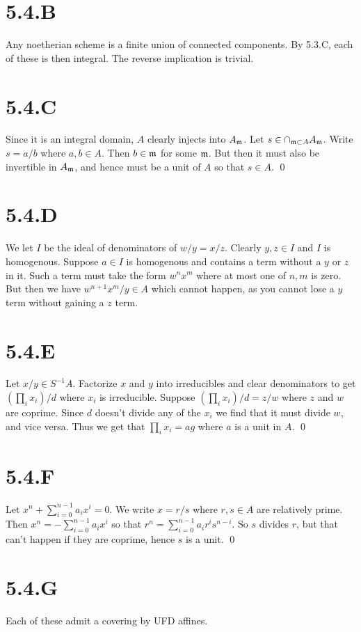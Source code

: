 \documentclass{article}
\begin{document}
\section{5.4.B}
Any noetherian scheme is a finite union of connected components. By 5.3.C, each of these is then integral. The reverse implication is trivial.

\section{5.4.C}
Since it is an integral domain, $A$ clearly injects into $A_{\mathfrak{m}}$. Let $s \in \cap_{\mathfrak{m} \subset A} A_{\mathfrak{m}}$. Write $s=a/b$ where $a, b \in A$. Then $b \in \mathfrak{m}$ for some $\mathfrak{m}$. But then it must also be invertible in $A_{\mathfrak{m}}$, and hence must be a unit of $A$ so that $s \in A$. \qed

\section{5.4.D}
We let $I$ be the ideal of denominators of $w/y=x/z$. Clearly $y, z \in I$ and $I$ is homogenous. Suppose $a \in I$ is homogenous and contains a term without a $y$ or $z$ in it. Such a term must take the form $w^nx^m$ where at most one of $n,m$ is zero. But then we have $w^{n+1}x^m/y \in A$ which cannot happen, as you cannot lose a $y$ term without gaining a $z$ term.

\section{5.4.E}
Let $x/y \in S^{-1}A$. Factorize $x$ and $y$ into irreducibles and clear denominators to get $(\prod_i x_i)/d$ where $x_i$ is irreducible. Suppose $(\prod_i x_i)/d=z/w$ where $z$ and $w$ are coprime. Since $d$ doesn't divide any of the $x_i$ we find that it must divide $w$, and vice versa. Thus we get that $\prod_i x_i=ag$ where $a$ is a unit in $A$. \qed

\section{5.4.F}
Let $x^n+\sum_{i=0}^{n-1} a_ix^i=0$. We write $x=r/s$ where $r, s \in A$ are relatively prime. Then $x^n=-\sum_{i=0}^{n-1} a_ix^{i}$ so that $r^n=\sum_{i=0}^{n-1} a_ir^is^{n-i}$. So $s$ divides $r$, but that can't happen if they are coprime, hence $s$ is a unit. \qed

\section{5.4.G}
Each of these admit a covering by UFD affines.
\end{document}
